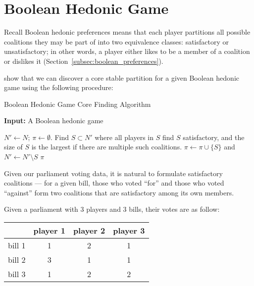 
\section{Boolean Hedonic Game}
\label{sec:boolean_hedonic_game}

Recall Boolean hedonic preferences means that each player partitions all possible
coalitions they may be part of into two equivalence classes:
satisfactory or unsatisfactory; in other words, a player either likes to be
a member of a coalition or dislikes it (Section~\ref{subsec:boolean_preferences}).

 show that we can discover a core
stable partition for a given Boolean hedonic game using the following procedure:

\begin{algorithm}[htb]
  \caption{Boolean Hedonic Game Core Finding Algorithm}
  \label{alg:boolean_core}
  \textbf{Input:} A Boolean hedonic game
  \begin{algorithmic}[1]

  \State $N' \leftarrow N$; $\pi \leftarrow \emptyset$.
    \State \label{boolean_core:select} Find $S \subset N'$ where all players
      in $S$ find $S$ satisfactory, and the size of $S$ is the largest if there
      are multiple such coalitions.
    \State $\pi \leftarrow \pi \cup \lbrace S \rbrace$ and
      $N' \leftarrow  N' \setminus S$
  \EndWhile
  \State \Return $\pi$

  \end{algorithmic}
\end{algorithm}

Given our parliament voting data, it is natural to formulate satisfactory
coalitions --- for a given bill, those who voted ``for'' and those who voted
``against'' form two coalitions that are satisfactory among its own members.

\begin{example}
\label{example:votes_boolean}
  Given a parliament with 3 players and 3 bills, their votes are as follow:

  \begin{table}[h!]
  \centering
  \begin{tabular}{|c|c|c|c|}
  \hline
         & player 1 & player 2 & player 3 \\ \hline
  bill 1 & 1 & 2 & 1 \\
  bill 2 & 3 & 1 & 1 \\
  bill 3 & 1 & 2 & 2 \\
  \hline
  \end{tabular}
  \end{table}
\end{example}


